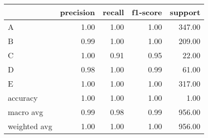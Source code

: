 \begin{tabular}{|l|r|r|r|r|}
\hline
{} &  precision &  recall &  f1-score &  support \\
\hline
A            &       1.00 &    1.00 &      1.00 &   347.00 \\
B            &       0.99 &    1.00 &      1.00 &   209.00 \\
C            &       1.00 &    0.91 &      0.95 &    22.00 \\
D            &       0.98 &    1.00 &      0.99 &    61.00 \\
E            &       1.00 &    1.00 &      1.00 &   317.00 \\
accuracy     &       1.00 &    1.00 &      1.00 &     1.00 \\
macro avg    &       0.99 &    0.98 &      0.99 &   956.00 \\
weighted avg &       1.00 &    1.00 &      1.00 &   956.00 \\
\hline
\end{tabular}
